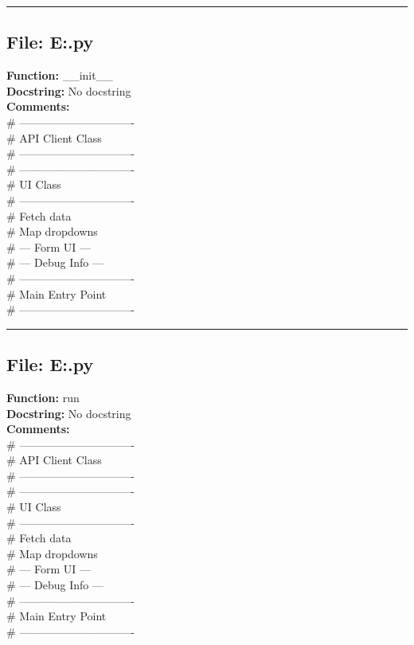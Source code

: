 {\hrule

\subsection*{File: E:\project\capstone\frontend\faculty\assignment.py}
\textbf{Function:} __init__\\
\textbf{Docstring:} No docstring\\
\textbf{Comments:}\\
# -------------------------------\\
# API Client Class\\
# -------------------------------\\
# -------------------------------\\
# UI Class\\
# -------------------------------\\
# Fetch data\\
# Map dropdowns\\
# --- Form UI ---\\
# --- Debug Info ---\\
# -------------------------------\\
# Main Entry Point\\
# -------------------------------\\

\hrule

\subsection*{File: E:\project\capstone\frontend\faculty\assignment.py}
\textbf{Function:} run\\
\textbf{Docstring:} No docstring\\
\textbf{Comments:}\\
# -------------------------------\\
# API Client Class\\
# -------------------------------\\
# -------------------------------\\
# UI Class\\
# -------------------------------\\
# Fetch data\\
# Map dropdowns\\
# --- Form UI ---\\
# --- Debug Info ---\\
# -------------------------------\\
# Main Entry Point\\
# -------------------------------\\

}
